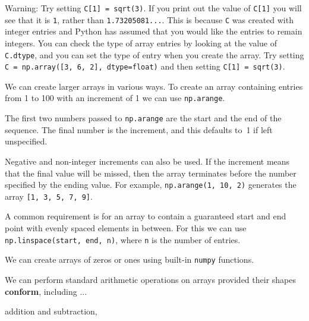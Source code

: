 
Warning: Try setting \texttt{C[1] = sqrt(3)}. If you print out the
value of \texttt{C[1]} you will see that it is \texttt{1}, rather than
\texttt{1.73205081...}. This is because \texttt{C} was created with
integer entries and Python has assumed that you would like the
entries to remain integers. You can check the type of array entries by
looking at the value of \texttt{C.dtype}, and you can set the type of
entry when you create the array. Try setting \texttt{C = np.array([3,
    6, 2], dtype=float)} and then setting \texttt{C[1] = sqrt(3)}.


We can create larger arrays in various ways. To create an array
containing entries from 1 to 100 with an increment of 1 we can use
\texttt{np.arange}.


The first two numbers passed to \texttt{np.arange} are the start and
the end of the sequence. The final number is the increment, and this
defaults to~1 if left unspecified.


\noindent
Negative and non-integer increments can also be used. If the increment
means that the final value will be missed, then the array terminates
before the number specified by the ending value. For example,
\texttt{np.arange(1, 10, 2)} generates the array \texttt{[1, 3, 5, 7,
    9]}.

A common requirement is for an array to contain a guaranteed start and
end point with evenly spaced elements in between. For this we can use
\texttt{np.linspace(start, end, n)}, where \texttt{n} is the number of
entries.


\noindent
We can create arrays of zeros or ones using built-in \texttt{numpy} functions.


We can perform standard arithmetic operations on arrays provided their shapes
\textbf{conform}, including ...



\noindent
addition and subtraction,


